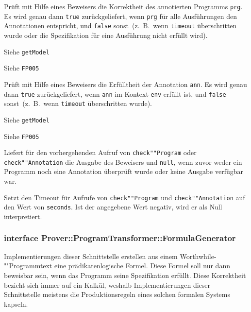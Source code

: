 
\begin{description}%


    Prüft mit Hilfe eines Beweisers die Korrektheit des annotierten
    Programms \texttt{prg}. Es wird genau dann \texttt{true}
    zurückgeliefert, wenn \texttt{prg} für alle Ausführungen den
    Annotationen entspricht, und \texttt{false} sonst~(z.~B.\, wenn
    \texttt{timeout} überschritten wurde oder die Spezifikation für
    eine Ausführung nicht erfüllt wird).%

    Siehe \texttt{getModel}%

    Siehe \texttt{FP005}%


    Prüft mit Hilfe eines Beweisers die Erfülltheit der Annotation
    \texttt{ann}. Es wird genau dann \texttt{true} zurückgeliefert,
    wenn \texttt{ann} im Kontext \texttt{env} erfüllt ist, und
    \texttt{false} sonst~(z.~B.\, wenn \texttt{timeout} überschritten
    wurde).%

    Siehe \texttt{getModel}%

    Siehe \texttt{FP005}%


    Liefert für den vorhergehenden Aufruf von \texttt{check""Program}
    oder \texttt{check""Annotation} die Ausgabe des Beweisers und
    \texttt{null}, wenn zuvor weder ein Programm noch eine Annotation
    überprüft wurde oder keine Ausgabe verfügbar war.%


    Setzt den Timeout für Aufrufe von \texttt{check""Program} und
    \texttt{check""Annotation} auf den Wert von \texttt{seconds}. Ist
    der angegebene Wert negativ, wird er als Null interpretiert.%

\end{description}%

\subsubsection{interface Prover::ProgramTransformer::FormulaGenerator}%

Implementierungen dieser Schnittstelle erstellen aus einem
Worthwhile-""Programmtext eine prädikatenlogische Formel. Diese Formel
soll nur dann beweisbar sein, wenn das Programm seine Spezifikation
erfüllt. Diese Korrektheit bezieht sich immer auf ein Kalkül, weshalb
Implementierungen dieser Schnittstelle meistens die Produktionsregeln
eines solchen formalen Systems kapseln.%

